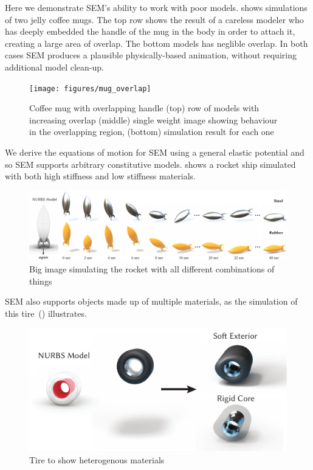 Here we demonstrate SEM's ability to work with poor models.  shows simulations of two jelly coffee mugs. 
The top row shows the result of a careless modeler who has deeply embedded the handle of the mug in the body in order to attach it, creating a large area of overlap.
The bottom models has neglible overlap. 
In both cases SEM produces a plausible physically-based animation, without requiring additional model clean-up.
\begin{figure}
  \texttt{[image: figures/mug\_overlap]}
  \caption{Coffee mug with overlapping handle (top) row of models with increasing overlap (middle) single weight image showing behaviour in the overlapping region, (bottom) simulation result for each one}
  \label{fig:badmodels}
\end{figure}

We derive the equations of motion for SEM using a general elastic potential and so SEM supports arbitrary constitutive models.  shows a 
rocket ship simulated with both high stiffness and low stiffness materials. 
\begin{figure}
  \includegraphics[width=\textwidth]{figures/rocket.pdf}
  \caption{Big image simulating the rocket with all different combinations of things}
  \label{fig:rocket}
\end{figure}

SEM also supports objects made up of multiple materials, as the simulation of this tire~() illustrates.
\begin{figure}
  \includegraphics[width=\columnwidth]{figures/tire}
  \caption{Tire to show heterogenous materials}
  \label{fig:tire}
\end{figure}


